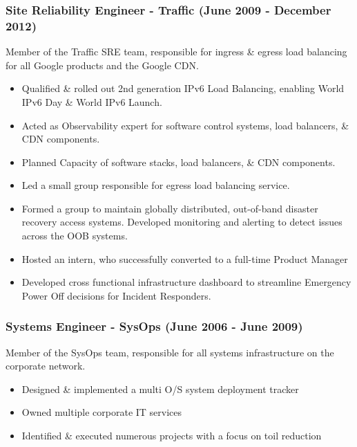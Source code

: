 \documentclass[a4paper, 10pt] {article}
\begin{document}
\newpage %

\subsubsection*{Site Reliability Engineer - Traffic (June 2009 - December 2012)}

Member of the Traffic SRE team, responsible for ingress \& egress load
balancing for all Google products and the Google CDN. 

\begin{itemize}[noitemsep]
  \item Qualified \& rolled out 2nd generation IPv6 Load Balancing, enabling World IPv6 Day \& World IPv6 Launch.
	\item Acted as Observability expert for software control systems, load balancers, \& CDN components.
	\item Planned Capacity of software stacks, load balancers, \& CDN components.
 	\item Led a small group responsible for egress load balancing service.
  	\item Formed a group to maintain globally distributed, out-of-band disaster recovery access systems. Developed monitoring and alerting to
   		detect issues across the OOB systems.
 	\item Hosted an intern, who successfully converted to a full-time Product Manager
	\item Developed cross functional infrastructure dashboard to streamline Emergency Power Off decisions for Incident Responders.
\end{itemize}

\subsubsection*{Systems Engineer - SysOps (June 2006 - June 2009)}

Member of the SysOps team, responsible for all systems infrastructure on
the corporate network.

\begin{itemize}[noitemsep]
	\item Designed \& implemented a multi O/S system deployment tracker
	\item Owned multiple corporate IT services
	\item Identified \& executed numerous projects with a focus on toil reduction
\end{itemize}
\end{document}
